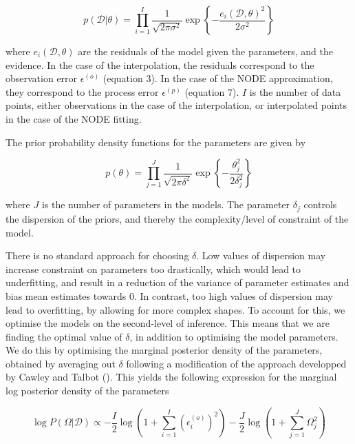 \documentclass[11pt, oneside]{article}
\begin{document}
\vspace{-0.5cm}
\begin{equation}
	p( \mathcal{D} | \theta) = \prod_{i=1}^{I} \frac{1}{\sqrt{2\pi\sigma^2}}  \exp \left\{ -\frac{e_i(\mathcal{D},\theta)^2}{2\sigma^2}  \right\}
\end{equation}

where $e_i(\mathcal{D},\theta)$ are the residuals of the model given the parameters, and the evidence. 
In the case of the interpolation, the residuals correspond to the observation error $\epsilon^{(o)}$ (equation 3).
In the case of the NODE approximation, they correspond to the process error $\epsilon^{(p)}$ (equation 7).
$I$ is the number of data points, either observations in the case of the interpolation, or interpolated points in the case of the NODE fitting.

The prior probability density functions for the parameters are given by

\vspace{-0.5cm}
\begin{equation}
	p(\theta) = \prod_{j=1}^{J} \frac{1}{\sqrt{2\pi\delta^2}}  \exp \left\{ -\frac{\theta_j^2}{2\delta_j^2}  \right\}
\end{equation}

where $J$ is the number of parameters in the models.
The parameter $\delta_j$ controls the dispersion of the priors, and thereby the complexity/level of constraint of the model.

There is no standard approach for choosing $\delta$.
Low values of dispersion may increase constraint on parameters too drastically, which would lead to underfitting, and result in a reduction of the variance of parameter estimates and bias mean estimates towards 0.
In contrast, too high values of dispersion may lead to overfitting, by allowing for more complex shapes.
To account for this, we optimise the models on the second-level of inference.
This means that we are finding the optimal value of $\delta$, in addition to optimising the model parameters. 
We do this by optimising the marginal posterior density of the parameters, obtained by averaging out $\delta$ following a modification of the approach developped by Cawley and Talbot (\cite{Cawley2007}). 
This yields the following expression for the marginal log posterior density of the parameters 

\vspace{-0.5cm}
\begin{equation}
    \log P(\Omega | \mathcal{D}) \propto - \frac{I}{2} \log \left(1 + \sum_{i=1}^{I} \left( \epsilon^{(o)}_i \right)^2 \right) - \frac{J}{2} \log \left(1 + \sum_{j=1}^{J} \Omega_{j}^2 \right)
\end{equation}
\end{document}
